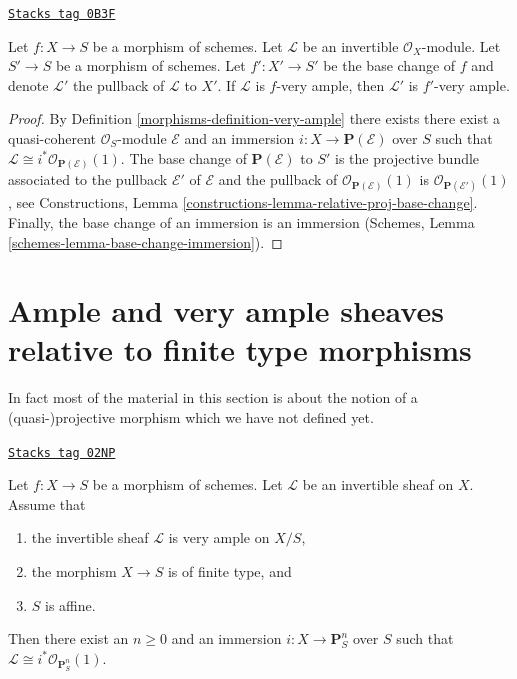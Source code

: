 \begin{lemma}
\label{morphisms-lemma-very-ample-base-change}
\href{https://stacks.math.columbia.edu/tag/0B3F}{\texttt{Stacks tag 0B3F}}

Let $f : X \to S$ be a morphism of schemes.
Let $\mathcal{L}$ be an invertible $\mathcal{O}_X$-module.
Let $S' \to S$ be a morphism of schemes.
Let $f' : X' \to S'$ be the base change of $f$ and denote
$\mathcal{L}'$ the pullback of $\mathcal{L}$ to $X'$.
If $\mathcal{L}$ is $f$-very ample, then $\mathcal{L}'$ is $f'$-very ample.
\end{lemma}

\begin{proof}

By Definition \ref{morphisms-definition-very-ample} there exists there exist a
quasi-coherent $\mathcal{O}_S$-module $\mathcal{E}$ and an immersion
$i : X \to \mathbf{P}(\mathcal{E})$ over $S$ such that
$\mathcal{L} \cong i^*\mathcal{O}_{\mathbf{P}(\mathcal{E})}(1)$.
The base change of $\mathbf{P}(\mathcal{E})$ to $S'$ is
the projective bundle associated to the pullback $\mathcal{E}'$
of $\mathcal{E}$ and the pullback of
$\mathcal{O}_{\mathbf{P}(\mathcal{E})}(1)$
is
$\mathcal{O}_{\mathbf{P}(\mathcal{E}')}(1)$, see
Constructions, Lemma \ref{constructions-lemma-relative-proj-base-change}.
Finally, the base change
of an immersion is an immersion
(Schemes, Lemma \ref{schemes-lemma-base-change-immersion}).
\end{proof}

\section{Ample and very ample sheaves relative to finite type morphisms}
\label{morphisms-section-ample-finite-type}
In fact most of the material in this section is about the notion of
a (quasi-)projective morphism which we have not defined yet.

\begin{lemma}
\label{morphisms-lemma-very-ample-finite-type-over-affine}
\href{https://stacks.math.columbia.edu/tag/02NP}{\texttt{Stacks tag 02NP}}

Let $f : X \to S$ be a morphism of schemes.
Let $\mathcal{L}$ be an invertible sheaf on $X$.
Assume that
\begin{enumerate}
\item the invertible sheaf $\mathcal{L}$ is very ample on $X/S$,
\item the morphism $X \to S$ is of finite type, and
\item $S$ is affine.
\end{enumerate}
Then there exist an $n \geq 0$ and an immersion
$i : X \to \mathbf{P}^n_S$ over $S$ such that
$\mathcal{L} \cong i^*\mathcal{O}_{\mathbf{P}^n_S}(1)$.
\end{lemma}


